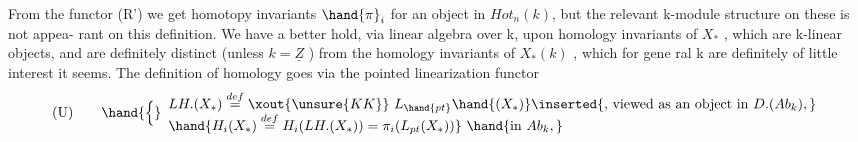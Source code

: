 From the  functor  (R')  we get homotopy invariants  $\hand{\pi}_{i}$ for an object
in  $Hot_{n}(k)$,  but the relevant k-module structure on these is not appea-%
rant on this definition.  We have a better hold,  via linear algebra over
k,  upon  homology invariants of $X_{*}$  ,  which are k-linear objects,  and
are definitely distinct (unless $k=\underline{Z}$ )  from the homology invariants of
$X_{*}(k)$ ,  which for gene ral k are definitely of little interest it seems.
The definition of homology goes via the pointed linearization functor \hand{:}
\[ \text{(U)} \qquad \hand{\Big\{} \begin{array}{l} LH.(X_{*}) \overset{def}{=} \xout{\unsure{KK}} \ L_{\hand{pt}}\hand{(X_{*})} \inserted{\text{, viewed as an object in }D.(Ab_{k}),} \\ \hand{H_{i}(X_{*}) \overset{def}{=} H_{i}(LH.(X_{*})) = \pi_{i}(L_{pt}(X_{*}))} \ \hand{\text{in }Ab_{k},} \end{array} \]

